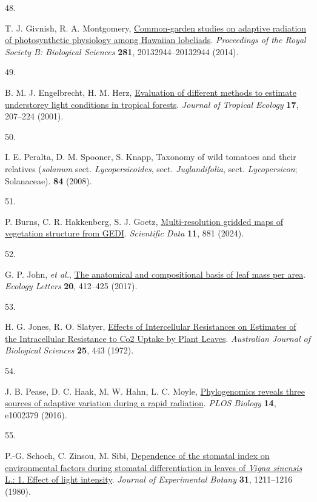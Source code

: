 \documentclass[
  letterpaper,
  DIV=11,
  numbers=noendperiod]{scrartcl}
\newlength{\cslhangindent}
\newlength{\csllabelwidth}
\newenvironment{CSLReferences}[2] %
 {\begin{list}{}{%
  \setlength{\itemindent}{0pt}
  \setlength{\leftmargin}{0pt}
  \setlength{\parsep}{0pt}
  \ifodd #1
   \setlength{\leftmargin}{\cslhangindent}
   \setlength{\itemindent}{-1\cslhangindent}
  \fi
  \setlength{\itemsep}{#2\baselineskip}}}
 {\end{list}}
\newcommand{\CSLLeftMargin}[1]{\parbox[t]{\csllabelwidth}{\strut#1\strut}}
\newcommand{\CSLRightInline}[1]{\parbox[t]{\linewidth - \csllabelwidth}{\strut#1\strut}}
\begin{document}
\begin{CSLReferences}{0}{1}
\CSLLeftMargin{48. }%
\CSLRightInline{T. J. Givnish, R. A. Montgomery,
\href{https://doi.org/10.1098/rspb.2013.2944}{Common-garden studies on
adaptive radiation of photosynthetic physiology among {Hawaiian}
lobeliads}. \emph{Proceedings of the Royal Society B: Biological
Sciences} \textbf{281}, 20132944--20132944 (2014).}

\CSLLeftMargin{49. }%
\CSLRightInline{B. M. J. Engelbrecht, H. M. Herz,
\href{https://doi.org/10.1017/S0266467401001146}{Evaluation of different
methods to estimate understorey light conditions in tropical forests}.
\emph{Journal of Tropical Ecology} \textbf{17}, 207--224 (2001).}

\CSLLeftMargin{50. }%
\CSLRightInline{I. E. Peralta, D. M. Spooner, S. Knapp, Taxonomy of wild
tomatoes and their relatives (\emph{solanum} sect.
\emph{Lycopersicoides}, sect. \emph{Juglandifolia}, sect.
\emph{Lycopersicon}; {Solanaceae}). \textbf{84} (2008).}

\CSLLeftMargin{51. }%
\CSLRightInline{P. Burns, C. R. Hakkenberg, S. J. Goetz,
\href{https://doi.org/10.1038/s41597-024-03668-4}{Multi-resolution
gridded maps of vegetation structure from {GEDI}}. \emph{Scientific
Data} \textbf{11}, 881 (2024).}

\CSLLeftMargin{52. }%
\CSLRightInline{G. P. John, \emph{et al.},
\href{https://doi.org/10.1111/ele.12739}{The anatomical and
compositional basis of leaf mass per area}. \emph{Ecology Letters}
\textbf{20}, 412--425 (2017).}

\CSLLeftMargin{53. }%
\CSLRightInline{H. G. Jones, R. O. Slatyer,
\href{https://doi.org/10.1071/BI9720443}{Effects of {Intercellular}
{Resistances} on {Estimates} of the {Intracellular} {Resistance} to
{Co2} {Uptake} by {Plant} {Leaves}}. \emph{Australian Journal of
Biological Sciences} \textbf{25}, 443 (1972).}

\CSLLeftMargin{54. }%
\CSLRightInline{J. B. Pease, D. C. Haak, M. W. Hahn, L. C. Moyle,
\href{https://doi.org/10.1371/journal.pbio.1002379}{Phylogenomics
reveals three sources of adaptive variation during a rapid radiation}.
\emph{PLOS Biology} \textbf{14}, e1002379 (2016).}

\CSLLeftMargin{55. }%
\CSLRightInline{P.-G. Schoch, C. Zinsou, M. Sibi,
\href{https://doi.org/10.1093/jxb/31.5.1211}{Dependence of the stomatal
index on environmental factors during stomatal differentiation in leaves
of \emph{{Vigna} sinensis} {L}.: 1. {Effect} of light intensity}.
\emph{Journal of Experimental Botany} \textbf{31}, 1211--1216 (1980).}


\end{CSLReferences}
\end{document}
